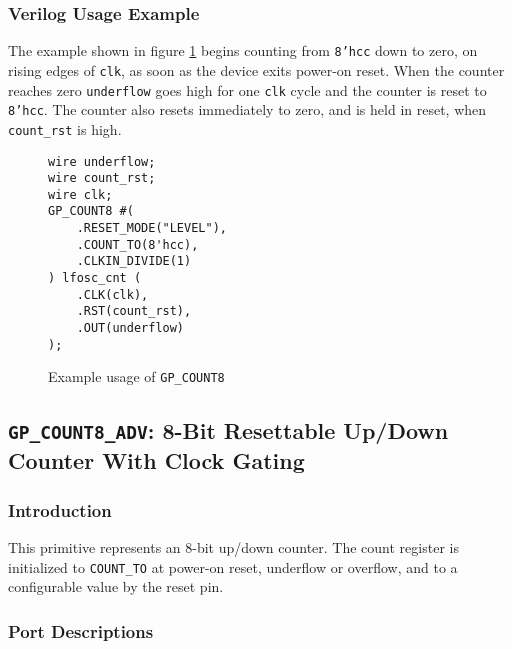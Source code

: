 \documentclass[11pt]{article}
\newcommand{\tokenstyle}[1]{\texttt{#1}}
\newcommand{\wirestyle}[1]{\texttt{#1}}
\newcommand{\datastyle}[1]{\texttt{#1}}
\begin{document}
\subsubsection{Verilog Usage Example}

The example shown in figure \ref{gp-count8-example} begins counting from \datastyle{8'hcc} down to zero,
on rising edges of \wirestyle{clk}, as soon as the device exits power-on reset. When the counter reaches zero
\wirestyle{underflow} goes high for one \wirestyle{clk} cycle and the counter is reset to \datastyle{8'hcc}.
The counter also resets immediately to zero, and is held in reset, when \wirestyle{count\_rst} is high.

\begin{figure}[h]
\begin{lstlisting}
wire underflow;
wire count_rst;
wire clk;
GP_COUNT8 #(
	.RESET_MODE("LEVEL"),
	.COUNT_TO(8'hcc),
	.CLKIN_DIVIDE(1)
) lfosc_cnt (
	.CLK(clk),
	.RST(count_rst),
	.OUT(underflow)
);
\end{lstlisting}
\caption{Example usage of \tokenstyle{GP\_COUNT8}}
\label{gp-count8-example}
\end{figure}


\pagebreak
\subsection{\tokenstyle{GP\_COUNT8\_ADV}: 8-Bit Resettable Up/Down Counter With Clock Gating}
\label{gp-count8-adv}

\subsubsection{Introduction}
This primitive represents an 8-bit up/down counter. The count register is initialized to \tokenstyle{COUNT\_TO} at
power-on reset, underflow or overflow, and to a configurable value by the reset pin.

\subsubsection{Port Descriptions}
\end{document}
